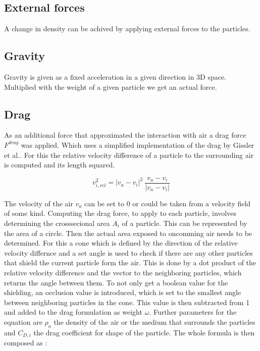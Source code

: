 \documentclass[intern]{cgMA}
\begin{document}
    \subsection{External forces}
    A change in density can be achived by applying external forces to the particles. 
    \subsection{Gravity}
    Gravity is given as a fixed acceleration in a given direction in 3D space. Multiplied with the weight of a given particle we get an actual force.
    \subsection{Drag}
    As an additional force that approximated the interaction with air a drag force $F^{drag}$ was applied. Which uses a simplified implementation of the drag by Gissler et al.. For this the relative velocity difference of a particle to the surrounding air is computed and its length squared. \cite{10.1016/j.cag.2017.09.002}

    \begin{equation}
        v^2_{i,rel} = |v_a - v_i|^2\ \frac{v_a - v_i}{|v_a - v_i|}
    \end{equation}

    The velocity of the air $v_a$ can be set to 0 or could be taken from a velocity field of some kind. Computing the drag force, to apply to each particle, involves determining the crosssecional area $A_i$ of a particle. This can be represented by the area of a circle. Then the actual area exposed to oncomming air needs to be determined. For this a cone which is defined by the direction of the relative velocity differnce and a set angle is used to check if there are any other particles that shield the current particle form the air. This is done by a dot product of the relative velocity difference and the vector to the neighboring particles, which returns the angle between them. To not only get a boolean value for the shielding, an occlusion value is introduced, which is set to the smallest angle between neighboring particles in the cone. This value is then subtracted from 1 and added to the drag formulation as weight $\omega$. Further parameters for the equation are $\rho_a$ the density of the air or the medium that surrounds the particles and $C_{D,i}$ the drag coefficient for shape of the particle. \cite{10.1016/j.cag.2017.09.002} The whole formula is then composed as : 
\end{document}
